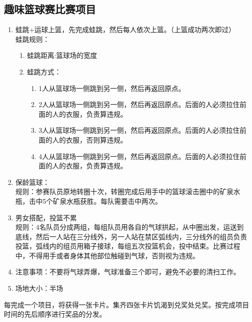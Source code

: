 \documentclass{article}
\begin{document}
\begin{CJK}{UTF8}{gbsn}
		\subsection{趣味篮球赛比赛项目}
		\begin{enumerate}
			\item 蛙跳+运球上篮，先完成蛙跳，然后每人依次上篮。（上篮成功两次即过）\\
			蛙跳规则：
			\begin{enumerate}
				\item 蛙跳距离:篮球场的宽度
				\item 蛙跳方式：
				\begin{enumerate}
					\item 1人从篮球场一侧跳到另一侧，然后再返回原点。
					\item 2人从篮球场一侧跳到另一侧，然后再返回原点。后面的人必须拉住前面的人的衣服，负责算违规。
					\item 3人从篮球场一侧跳到另一侧，然后再返回原点。后面的人必须拉住前面的人的衣服，否则算违规。
					\item 4人从篮球场一侧跳到另一侧，然后再返回原点。后面的人必须拉住前面的人的衣服，负责算违规。
				\end{enumerate}
			\end{enumerate}
							\item 保龄篮球：\\
							规则：参赛队员原地转圈十次，转圈完成后用手中的篮球滚击圈中的矿泉水瓶，击中5个矿泉水瓶获胜。每队需要击中两次。
							\item 男女搭配，投篮不累\\
							规则：4名队员分成两组，每组队员用各自的气球拱起，从中圈出发，运送到底线，然后一人站在三分线外，另一人站在禁区弧线内，三分线外的组员负责投篮，弧线内的组员用箱子接球，每组五次投篮机会，投中结束。比赛过程中，不得用手或者身体其他部位触碰到气球，否则视为违规。
							\item 注意事项：不要将气球弄爆，气球准备三个即可，避免不必要的清扫工作。
							\item 场地大小：半场
		\end{enumerate}
		每完成一个项目，将获得一张卡片。集齐四张卡片饥渴到兑奖处兑奖。按完成项目时间的先后顺序进行奖品的分发。
		

\end{CJK}
\end{document}
